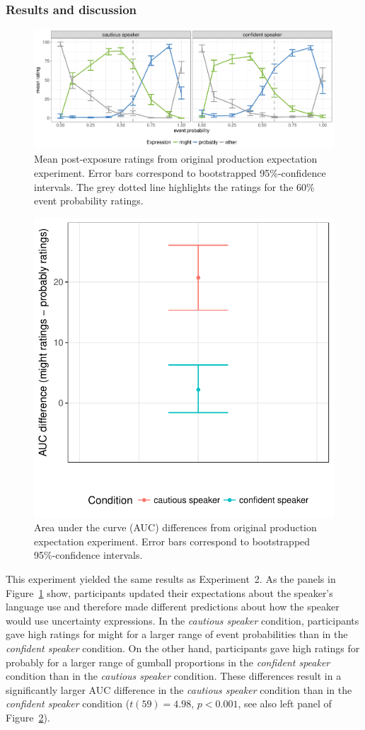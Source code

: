 \documentclass[man, floatsintext]{apa6}
\begin{document}
\subsubsection{Results and discussion}

\begin{figure}
\includegraphics[width=\textwidth]{plots/exp-1-ratings.pdf}
\caption{Mean post-exposure ratings from original production expectation experiment. Error bars correspond to bootstrapped 95\%-confidence intervals.  The grey dotted line highlights the ratings for the 60\% event probability ratings.  \label{fig:adaptation-results-prod-orig}}
\end{figure}

\begin{figure}
\center
\includegraphics[width=.4\textwidth]{plots/exp-1-auc-orig.pdf}
\caption{Area under the curve (AUC) differences from original production expectation experiment. Error bars correspond to bootstrapped 95\%-confidence intervals.  \label{fig:adaptation-auc-prod-orig}}
\end{figure}

This experiment yielded the same results as Experiment~2. As the panels in Figure~\ref{fig:adaptation-results-prod-orig} show, participants updated their expectations about the speaker's language use and therefore made different predictions about how the speaker would use uncertainty expressions. In the \emph{cautious speaker} condition, participants gave high ratings for {\sc might} for a larger range of event probabilities than in the \emph{confident speaker} condition. On the other hand, participants gave high ratings for {\sc probably} for a larger range of gumball proportions in the \emph{confident speaker} condition than in the \emph{cautious speaker} condition. These differences result in a significantly larger AUC difference in the \emph{cautious speaker} condition than in the \emph{confident speaker} condition ($t(59) = 4.98$, $p < 0.001$, see also left panel of Figure~\ref{fig:adaptation-auc-prod-orig}).
\end{document}
